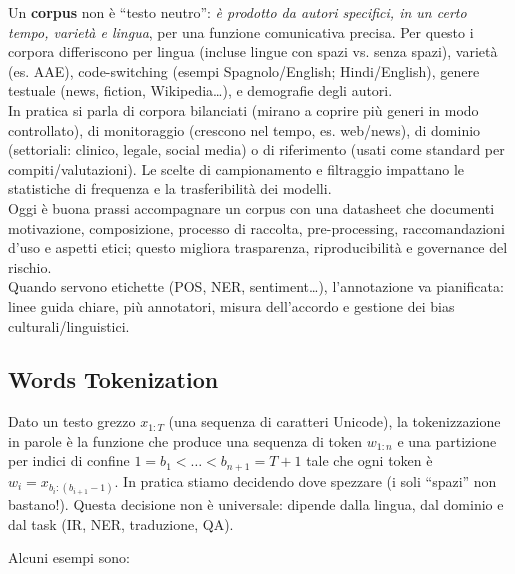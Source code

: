                 Un \textbf{corpus} non è “testo neutro”: \textit{è prodotto da autori specifici, in un certo tempo, varietà e lingua}, per una funzione comunicativa precisa. Per questo i corpora differiscono per lingua (incluse lingue con spazi vs. senza spazi), varietà (es. AAE), code-switching (esempi Spagnolo/English; Hindi/English), genere testuale (news, fiction, Wikipedia…), e demografie degli autori.\\
    
                In pratica si parla di corpora bilanciati (mirano a coprire più generi in modo controllato), di monitoraggio (crescono nel tempo, es. web/news), di dominio (settoriali: clinico, legale, social media) o di riferimento (usati come standard per compiti/valutazioni). Le scelte di campionamento e filtraggio impattano le statistiche di frequenza e la trasferibilità dei modelli.\\
    
                Oggi è buona prassi accompagnare un corpus con una datasheet che documenti motivazione, composizione, processo di raccolta, pre-processing, raccomandazioni d’uso e aspetti etici; questo migliora trasparenza, riproducibilità e governance del rischio.\\
                Quando servono etichette (POS, NER, sentiment…), l’annotazione va pianificata: linee guida chiare, più annotatori, misura dell’accordo e gestione dei bias culturali/linguistici.

        \newpage
        
        \subsection{Words Tokenization}
        
            Dato un testo grezzo $x_{1:T}$ (una sequenza di caratteri Unicode), la tokenizzazione in parole è la funzione che produce una sequenza di token $w_{1:n}$ e una partizione per indici di confine $1=b_1<\dots<b_{n+1}=T+1$ tale che ogni token è $w_i = x_{b_i:(b_{i+1}-1)}$. In pratica stiamo decidendo dove spezzare (i soli “spazi” non bastano!). Questa decisione non è universale: dipende dalla lingua, dal dominio e dal task (IR, NER, traduzione, QA).

            Alcuni esempi sono:
            
